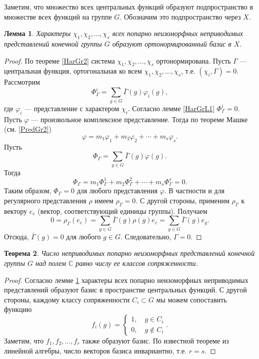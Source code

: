 \documentclass[12pt, titlepage, oneside]{amsbook}
\newcommand{\CC}{\mathbb{C}}
\newtheorem{theorem}{Теорема}[chapter]
\newtheorem{lemma}[theorem]{Лемма}
\theoremstyle{definition}
\theoremstyle{remark}
\begin{document}
Заметим, что множество всех центральных функций образуют подпространство в множестве всех функций на группе $G$. Обозначим это подпространство через $X$.

\begin{lemma}
	\label{HarGrL2}
	Характеры $\chi_1,\chi_2,\ldots,\chi_s$ всех попарно неизоморфных неприводимых представлений конечной группы $G$ образуют ортонормированный базис в $X$.
\end{lemma}

\begin{proof}
	По теореме \ref{HarGr2} система $\chi_1,\chi_2,\ldots,\chi_s$ ортонормирована. Пусть $\Gamma$ --- центральная функция, ортогональная ко всем $\chi_1,\chi_2,\ldots,\chi_s$, т.е. $(\chi_i,\Gamma)=0$. Рассмотрим $$\Phi^i_{\Gamma}=\sum\limits_{g\in G}\bar{\Gamma}(g)\varphi_i(g),$$ где $\varphi_i$ --- представление с характером $\chi_i$. Согласно лемме \ref{HarGrL1} $\Phi^i_{\Gamma}=0$. Пусть $\varphi$ --- произвольное комплексное представление. Тогда по теореме Машке (см. \ref{PredGr2}) $$\varphi=m_1\varphi_1+m_2\varphi_2+\cdots+m_s\varphi_s.$$ Пусть $$\Phi_{\Gamma}=\sum\limits_{g\in G}\bar{\Gamma}(g)\varphi(g).$$ Тогда $$\Phi_{\Gamma}=m_1\Phi^1_{\Gamma}+m_2\Phi^2_{\Gamma}+\cdots+m_s\Phi^s_{\Gamma}=0.$$ Таким образом, $\Phi_{\Gamma}=0$ для любого представления $\varphi$. В частности и для регулярного представления $\rho$ имеем $\rho_{\Gamma}=0$. С другой стороны, применим $\rho_{\Gamma}$ к вектору $e_e$ (вектор, соответствующий единицы группы). Получаем $$0=\rho_{\Gamma}(e_e)=\sum\limits_{g\in G}\bar{\Gamma}(g)\rho(g)e_e=\sum\limits_{g\in G}\bar{\Gamma}(g)e_g.$$ Отсюда, $\bar{\Gamma}(g)=0$ для любого $g\in G$. Следовательно, $\Gamma=0$.
\end{proof}

\begin{theorem}
	\label{HarGr6}
	Число неприводимых попарно неизоморфных представлений конечной группы $G$ над полем $\CC$ равно числу ее классов сопряженности.
\end{theorem}

\begin{proof}
	Согласно лемме \ref{HarGrL2} характеры всех попарно неизоморфных неприводимых представлений образуют базис в пространстве центральных функций. С другой стороны, каждому классу сопряженности $C_i\subset G$ мы можем сопоставить функцию $$f_i(g)=\begin{cases} 1,\quad g\in C_i \\
			0,\quad g\not\in C_i\end{cases}.$$ Заметим, что $f_1,f_2,\ldots,f_r$ также образуют базис. По известной теореме из линейной алгебры, число векторов базиса инвариантно, т.е. $r=s$.
\end{proof}
\end{document}

